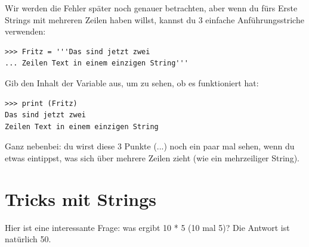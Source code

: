 Wir werden die Fehler später noch genauer betrachten, aber wenn du fürs Erste Strings mit mehreren Zeilen haben willst, kannst du 3 einfache Anführungsstriche verwenden:

\begin{Verbatim}[frame=single]
>>> Fritz = '''Das sind jetzt zwei
... Zeilen Text in einem einzigen String'''
\end{Verbatim}

\noindent
Gib den Inhalt der Variable aus, um zu sehen, ob es funktioniert hat:

\begin{Verbatim}[frame=single]
>>> print (Fritz)
Das sind jetzt zwei
Zeilen Text in einem einzigen String
\end{Verbatim}

Ganz nebenbei: du wirst diese 3 Punkte (...) noch ein paar mal sehen, wenn du etwas eintippst, was sich über mehrere Zeilen zieht (wie ein mehrzeiliger String).

\section{Tricks mit Strings}\label{trickswithstrings}

Hier ist eine interessante Frage: was ergibt 10 * 5 (10 mal 5)? Die Antwort ist natürlich 50.

